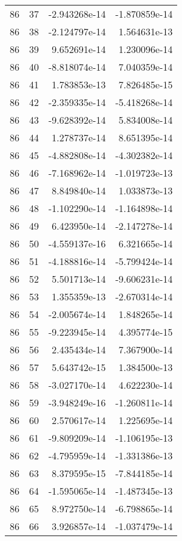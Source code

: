 \begin{tabular}{rrrr}
  86 &   37 & -2.943268e-14 & -1.870859e-14 \\
  86 &   38 & -2.124797e-14 &  1.564631e-13 \\
  86 &   39 &  9.652691e-14 &  1.230096e-14 \\
  86 &   40 & -8.818074e-14 &  7.040359e-14 \\
  86 &   41 &  1.783853e-13 &  7.826485e-15 \\
  86 &   42 & -2.359335e-14 & -5.418268e-14 \\
  86 &   43 & -9.628392e-14 &  5.834008e-14 \\
  86 &   44 &  1.278737e-14 &  8.651395e-14 \\
  86 &   45 & -4.882808e-14 & -4.302382e-14 \\
  86 &   46 & -7.168962e-14 & -1.019723e-13 \\
  86 &   47 &  8.849840e-14 &  1.033873e-13 \\
  86 &   48 & -1.102290e-14 & -1.164898e-14 \\
  86 &   49 &  6.423950e-14 & -2.147278e-14 \\
  86 &   50 & -4.559137e-16 &  6.321665e-14 \\
  86 &   51 & -4.188816e-14 & -5.799424e-14 \\
  86 &   52 &  5.501713e-14 & -9.606231e-14 \\
  86 &   53 &  1.355359e-13 & -2.670314e-14 \\
  86 &   54 & -2.005674e-14 &  1.848265e-14 \\
  86 &   55 & -9.223945e-14 &  4.395774e-15 \\
  86 &   56 &  2.435434e-14 &  7.367900e-14 \\
  86 &   57 &  5.643742e-15 &  1.384500e-13 \\
  86 &   58 & -3.027170e-14 &  4.622230e-14 \\
  86 &   59 & -3.948249e-16 & -1.260811e-14 \\
  86 &   60 &  2.570617e-14 &  1.225695e-14 \\
  86 &   61 & -9.809209e-14 & -1.106195e-13 \\
  86 &   62 & -4.795959e-14 & -1.331386e-13 \\
  86 &   63 &  8.379595e-15 & -7.844185e-14 \\
  86 &   64 & -1.595065e-14 & -1.487345e-13 \\
  86 &   65 &  8.972750e-14 & -6.798865e-14 \\
  86 &   66 &  3.926857e-14 & -1.037479e-14 \\

\end{tabular}
